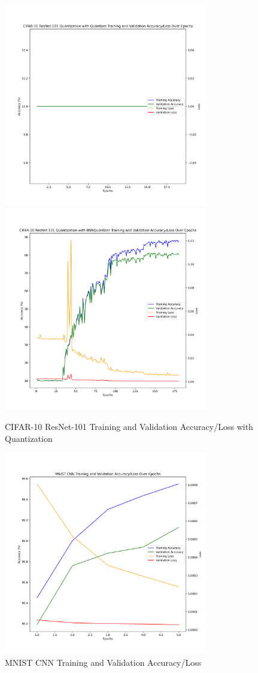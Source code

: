 \documentclass{article}
\begin{document}
\begin{figure}
	\centerline{\includegraphics[width=3.5in]{../proj2/figures/cifar10_resnet101_QAT_Quantizer.png}\includegraphics[width=3.5in]{../proj2/figures/cifar10_resnet101_BNNQuantizer.png}}
	\caption{CIFAR-10 ResNet-101 Training and Validation Accuracy/Loss with Quantization}
	\label{fig:resnet-charts}
\end{figure}


\begin{figure}
	\centerline{\includegraphics[width=3.5in]{../proj2/figures/mnist_baseline.png}}
	\caption{MNIST CNN Training and Validation Accuracy/Loss}
	\label{fig:mnist-charts-nq}
\end{figure}
\end{document}
